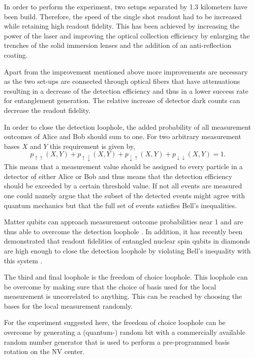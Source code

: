 In order to perform the experiment, two setups separated by 1.3 kilometers have been build. Therefore, the speed of the single shot readout had to be increased while retaining high readout fidelity. This has been achieved by increasing the power of the laser and improving the optical collection efficiency by enlarging the trenches of the solid immersion lenses and the addition of an anti-reflection coating.

Apart from the improvement mentioned above more improvements are necessary as the two set-ups are connected through optical fibers that have  attenuations resulting in a decrease of the detection efficiency and thus in a lower success rate for entanglement generation. The relative increase of detector dark counts can decrease the readout fidelity. 

In order to close the detection loophole, the added probability of all measurement outcomes of Alice and Bob should sum to one. For two arbitrary measurement bases $X$ and $Y$ this requirement is given by, 
\begin{equation}
p_{\uparrow \uparrow}\left( X, Y \right) + p_{\uparrow \downarrow}\left( X, Y \right) + p_{\downarrow \uparrow}\left( X, Y \right) + p_{\downarrow \downarrow}\left( X, Y \right) = 1.
\end{equation}
This means that a measurement value should be assigned to every particle in a detector of either Alice or Bob and thus means that the detection efficiency should be exceeded by a certain threshold value. If not all events are measured one could namely argue that the subset of the detected events might agree with quantum mechanics but that the full set of events satisfies Bell's inequalities. 

Matter qubits can approach measurement outcome probabilities near 1 and are thus able to overcome the detection loophole \cite{rowe2001experimental}. In addition, it has recently been demonstrated that readout fidelities of entangled nuclear spin qubits in diamonds are high enough to close the detection loophole by violating Bell's inequality with this system \cite{pfaff2013demonstration}.

The third and final loophole is the freedom of choice loophole. This loophole can be overcome by making sure that the choice of basis used for the local measurement is uncorrelated to anything. This can be reached by choosing the bases for the local measurement randomly.

For the experiment suggested here, the freedom of choice loophole can be overcome by generating a (quantum-) random bit with a commercially available random number generator that is used to perform a pre-programmed basis rotation on the NV center.
